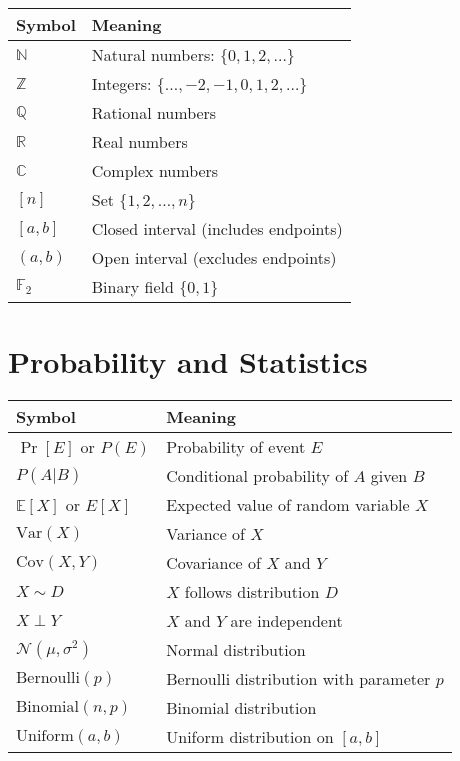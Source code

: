 \begin{center}
\begin{tabular}{|l|l|}
\hline
\textbf{Symbol} & \textbf{Meaning} \\
\hline
$\mathbb{N}$ & Natural numbers: $\{0, 1, 2, \ldots\}$ \\
$\mathbb{Z}$ & Integers: $\{\ldots, -2, -1, 0, 1, 2, \ldots\}$ \\
$\mathbb{Q}$ & Rational numbers \\
$\mathbb{R}$ & Real numbers \\
$\mathbb{C}$ & Complex numbers \\
$[n]$ & Set $\{1, 2, \ldots, n\}$ \\
$[a, b]$ & Closed interval (includes endpoints) \\
$(a, b)$ & Open interval (excludes endpoints) \\
$\mathbb{F}_2$ & Binary field $\{0, 1\}$ \\
\hline
\end{tabular}
\end{center}

\section{Probability and Statistics}

\begin{center}
\begin{tabular}{|l|l|}
\hline
\textbf{Symbol} & \textbf{Meaning} \\
\hline
$\Pr[E]$ or $P(E)$ & Probability of event $E$ \\
$P(A|B)$ & Conditional probability of $A$ given $B$ \\
$\mathbb{E}[X]$ or $E[X]$ & Expected value of random variable $X$ \\
$\text{Var}(X)$ & Variance of $X$ \\
$\text{Cov}(X,Y)$ & Covariance of $X$ and $Y$ \\
$X \sim D$ & $X$ follows distribution $D$ \\
$X \perp Y$ & $X$ and $Y$ are independent \\
$\mathcal{N}(\mu, \sigma^2)$ & Normal distribution \\
$\text{Bernoulli}(p)$ & Bernoulli distribution with parameter $p$ \\
$\text{Binomial}(n, p)$ & Binomial distribution \\
$\text{Uniform}(a, b)$ & Uniform distribution on $[a, b]$ \\
\hline
\end{tabular}
\end{center}

